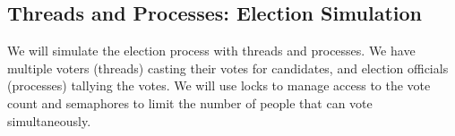 \documentclass[oneside,11pt,dvipsnames]{book}
\begin{document}





\subsection{Threads and Processes: Election Simulation}
We will simulate the election process with threads and processes. We have multiple voters (threads) casting their votes for candidates, and election officials (processes) tallying the votes. We will use locks to manage access to the vote count and semaphores to limit the number of people that can vote simultaneously.
\end{document}
